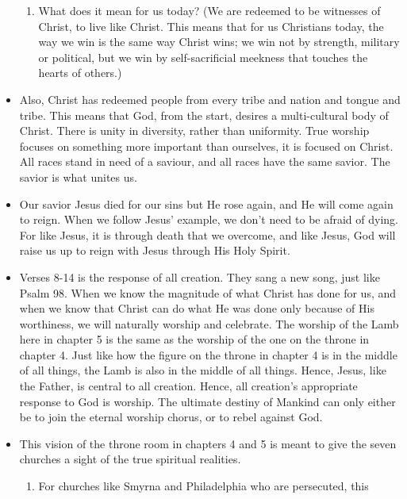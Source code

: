 \begin{itemize}
{\begin{enumerate}
{    mind-blowing!  This Lamb is actually very powerful, with seven horns.
    This Lamb is also all knowing, with seven eyes.  THis Lamb is very
    powerful, but He wins the victory through His sacrificial death and
    through His resurrection.)}
    \item{What does it mean for us today?  (We are redeemed to be witnesses
    of Christ, to live like Christ.  This means that for us Christians today,
    the way we win is the same way Christ wins; we win not by strength,
    military or political, but we win by self-sacrificial meekness that
    touches the hearts of others.)}
  \end{enumerate}}
  \item{Also, Christ has redeemed people from every tribe and nation and
  tongue and tribe.  This means that God, from the start, desires a
  multi-cultural body of Christ.  There is unity in diversity, rather than
  uniformity.  True worship focuses on something more important than
  ourselves, it is focused on Christ.  All races stand in need of a saviour,
  and all races have the same savior.  The savior is what unites us.}
  \item{Our savior Jesus died for our sins but He rose again, and He will
  come again to reign.  When we follow Jesus' example, we don't need to be
  afraid of dying. For like Jesus, it is through death that we overcome, and
  like Jesus, God will raise us up to reign with Jesus through His Holy Spirit.}
  \item{Verses 8-14 is the response of all creation.  They sang a new song,
  just like Psalm 98.  When we know the magnitude of what Christ has done for
  us, and when we know that Christ can do what He was done only because of
  His worthiness, we will naturally worship and celebrate.  The
  worship of the Lamb here in chapter 5 is the same as the worship of the one
  on the throne in chapter 4.  Just like how the figure on the throne in
  chapter 4 is in the middle of all things, the Lamb is also in the middle of
  all things.  Hence, Jesus, like the Father, is central to all creation.
  Hence, all creation's appropriate response to God is worship.  The ultimate
  destiny of Mankind can only either be to join the eternal worship chorus,
  or to rebel against God.  }
  \item{This vision of the throne room in chapters 4 and 5 is meant to give
  the seven churches a sight of the true spiritual realities.
  \begin{enumerate}
    \item{For churches like Smyrna and Philadelphia who are persecuted, this
}
\end{enumerate}}
\end{itemize}
